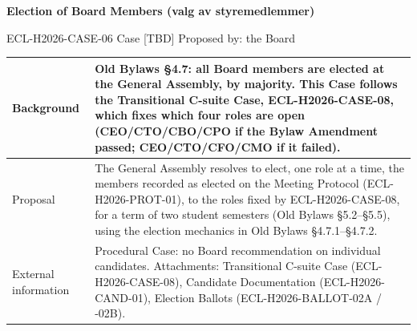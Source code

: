 \documentclass{../../../Common/Latex/Templates/rapport}
\date{[DATE OF GENERAL ASSEMBLY: TBD]}
\begin{document}
\reportmainmatter
\small
\setlength{\parindent}{0pt}
\setlength{\tabcolsep}{6pt}
\renewcommand{\arraystretch}{1.2}

\begin{center}
  {\Large\bfseries Election of Board Members (valg av styremedlemmer)}\par
  \vspace{0.15cm}
  {\normalsize ECL-H2026-CASE-06 \quad Case [TBD] \quad Proposed by: the Board}\par
\end{center}

\vspace{0.3cm}
\begin{tabularx}{\textwidth}{|>{\bfseries\raggedright\arraybackslash}p{4.2cm}|X|}
  \hline
  Background           & Old Bylaws \S4.7: all Board members are elected at the General Assembly, by majority. This Case follows the Transitional C-suite Case, ECL-H2026-CASE-08, which fixes which four roles are open (CEO/CTO/CBO/CPO if the Bylaw Amendment passed; CEO/CTO/CFO/CMO if it failed).                                \\
  \hline
  Proposal             & The General Assembly resolves to elect, one role at a time, the members recorded as elected on the Meeting Protocol (ECL-H2026-PROT-01), to the roles fixed by ECL-H2026-CASE-08, for a term of two student semesters (Old Bylaws \S5.2--\S5.5), using the election mechanics in Old Bylaws \S4.7.1--\S4.7.2. \\
  \hline
  External information & Procedural Case: no Board recommendation on individual candidates. Attachments: Transitional C-suite Case (ECL-H2026-CASE-08), Candidate Documentation (ECL-H2026-CAND-01), Election Ballots (ECL-H2026-BALLOT-02A / -02B).                                                                                   \\
  \hline
\end{tabularx}
\end{document}
